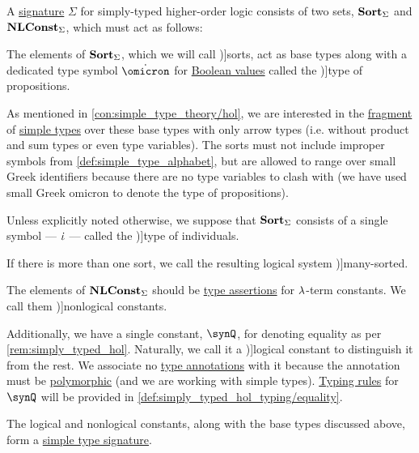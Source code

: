 \begin{definition}\label{def:simply_typed_hol_signature}\mimprovised
  A \hyperref[con:improper_symbol]{signature} \( \Sigma \) for simply-typed higher-order logic consists of two  sets, \( \op*{Sort}_\Sigma \) and \( \op*{NLConst}_\Sigma \), which must act as follows:
  \begin{thmenum}
     The elements of \( \op*{Sort}_\Sigma \), which we will call \term[en=sorts (\cite[35]{BaaderNipkow2012TermRewriting})]{sorts}, act as base types along with a dedicated type symbol \( \syn\omicron \) for \hyperref[con:boolean_value]{Boolean values} called the \term[en=type of propositions (\cite[56]{Church1940STT})]{type of propositions}.

    As mentioned in \cref{con:simple_type_theory/hol}, we are interested in the \hyperref[con:syntax_fragment]{fragment} of \hyperref[def:simple_type]{simple types} over these base types with only arrow types (i.e. without product and sum types or even type variables). The sorts must not include improper symbols from \cref{def:simple_type_alphabet}, but are allowed to range over small Greek identifiers because there are no type variables to clash with (we have used small Greek omicron to denote the type of propositions).

    Unless explicitly noted otherwise, we suppose that \( \op*{Sort}_\Sigma \) consists of a single symbol --- \( \dot{\iota} \) --- called the \term[en=type of individuals (\cite[56]{Church1940STT})]{type of individuals}.

    If there is more than one sort, we call the resulting logical system \term[en=many-sorted predicate logic (\cite[\S 4.4.13]{TroelstraSchwichtenberg2000BasicProofTheory})]{many-sorted}.

     The elements of \( \op*{NLConst}_\Sigma \) should be \hyperref[def:type_assertion]{type assertions} for  \( {\mathrm \lambda} \)-term constants. We call them \term[en=nonlogical constants (\cite[211]{Andrews2002Logic})]{nonlogical constants}.

    Additionally, we have a single constant, \( \synQ \), for denoting equality as per \cref{rem:simply_typed_hol}. Naturally, we call it a \term[en=logical constants (\cite[211]{Andrews2002Logic})]{logical constant} to distinguish it from the rest. We associate no \hyperref[con:type_annotation]{type annotations} with it because the annotation must be \hyperref[def:polymorphic_typed_lambda_calculus]{polymorphic} (and we are working with simple types). \hyperref[con:typing_rule]{Typing rules} for \( \synQ \) will be provided in \cref{def:simply_typed_hol_typing/equality}.

    The logical and nonlogical constants, along with the base types discussed above, form a \hyperref[def:simple_type_signature]{simple type signature}.
  \end{thmenum}
\end{definition}
